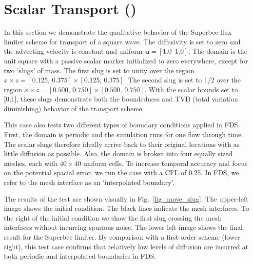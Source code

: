\documentclass[11pt]{book}
\begin{document}
\clearpage

\section{Scalar Transport (\texorpdfstring{}{move\_slug})}

In this section we demonstrate the qualitative behavior of the Superbee flux limiter scheme for transport of a square wave.
The diffusivity is set to zero and the advecting velocity is constant and uniform $\mathbf{u} = [1.0\,\,\,1.0]$.
The domain is the unit square with a passive scalar marker initialized to zero everywhere, except for two `slugs' of mass.
The first slug is set to unity over the region $x \times z = [0.125,\,0.375] \times [0.125,\,0.375]$.
The second slug is set to 1/2 over the region $x \times z = [0.500,\,0.750] \times [0.500,\,0.750]$.
With the scalar bounds set to [0,1], these slugs demonstrate both the boundedness and TVD (total variation diminishing) behavior of the transport scheme.

This case also tests two different types of boundary conditions applied in FDS.  First, the domain is periodic and the simulation runs for one flow through time.
The scalar slugs therefore ideally arrive back to their original locations with as little diffusion as possible.
Also, the domain is broken into four equally sized meshes, each with $40 \times 40$ uniform cells.
To increase temporal accuracy and focus on the potential spacial error, we run the case with a CFL of 0.25.  In FDS, we refer to the mesh interface as an `interpolated boundary'.

The results of the test are shown visually in Fig.~\ref{fig_move_slug}.  The upper-left image shows the initial condition.
The black lines indicate the mesh interfaces.  To the right of the initial condition we show the first slug crossing the mesh interfaces without incurring spurious noise.
The lower left image shows the final result for the Superbee limiter.  By comparison with a first-order scheme (lower right),
this test case confirms that relatively low levels of diffusion are incurred at both periodic and interpolated boundaries in FDS.
\end{document}
